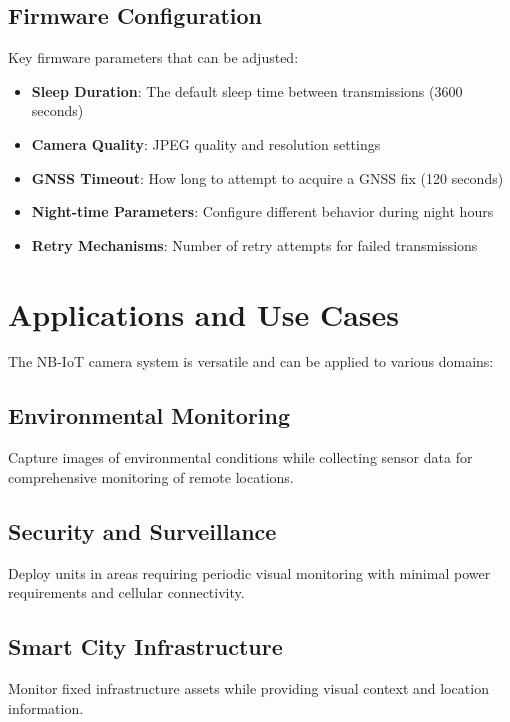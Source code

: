 \documentclass[11pt,a4paper]{article}
\begin{document}
\subsection{Firmware Configuration}

Key firmware parameters that can be adjusted:

\begin{itemize}
    \item \textbf{Sleep Duration}: The default sleep time between transmissions (3600 seconds)
    \item \textbf{Camera Quality}: JPEG quality and resolution settings
    \item \textbf{GNSS Timeout}: How long to attempt to acquire a GNSS fix (120 seconds)
    \item \textbf{Night-time Parameters}: Configure different behavior during night hours
    \item \textbf{Retry Mechanisms}: Number of retry attempts for failed transmissions
\end{itemize}

\section{Applications and Use Cases}

The NB-IoT camera system is versatile and can be applied to various domains:

\subsection{Environmental Monitoring}

Capture images of environmental conditions while collecting sensor data for comprehensive monitoring of remote locations.

\subsection{Security and Surveillance}

Deploy units in areas requiring periodic visual monitoring with minimal power requirements and cellular connectivity.

\subsection{Smart City Infrastructure}

Monitor fixed infrastructure assets while providing visual context and location information.
\end{document}
